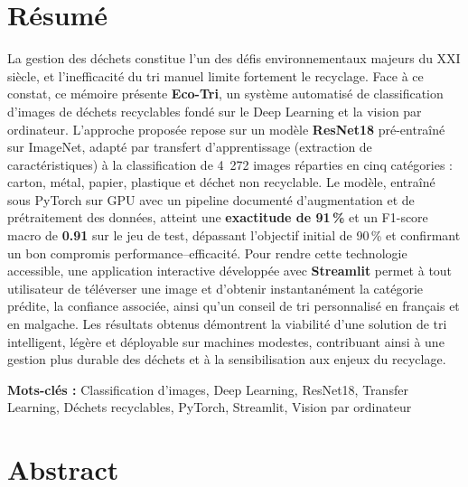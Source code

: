 \documentclass[12pt,a4paper]{report}
\begin{document}
\tableofcontents
\newpage

\listoffigures
{}
\newpage

\listoftables
{}
\newpage

\chapter*{Résumé}

La gestion des déchets constitue l'un des défis environnementaux majeurs du XXI siècle, et l'inefficacité du tri manuel limite fortement le recyclage. Face à ce constat, ce mémoire présente \textbf{Eco-Tri}, un système automatisé de classification d'images de déchets recyclables fondé sur le Deep Learning et la vision par ordinateur. L'approche proposée repose sur un modèle \textbf{ResNet18} pré-entraîné sur ImageNet, adapté par transfert d'apprentissage (extraction de caractéristiques) à la classification de 4~272 images réparties en cinq catégories : carton, métal, papier, plastique et déchet non recyclable. Le modèle, entraîné sous PyTorch sur GPU avec un pipeline documenté d'augmentation et de prétraitement des données, atteint une \textbf{exactitude de 91\,\%} et un F1-score macro de \textbf{0.91} sur le jeu de test, dépassant l'objectif initial de 90\,\% et confirmant un bon compromis performance--efficacité. Pour rendre cette technologie accessible, une application interactive développée avec \textbf{Streamlit} permet à tout utilisateur de téléverser une image et d'obtenir instantanément la catégorie prédite, la confiance associée, ainsi qu'un conseil de tri personnalisé en français et en malgache. Les résultats obtenus démontrent la viabilité d'une solution de tri intelligent, légère et déployable sur machines modestes, contribuant ainsi à une gestion plus durable des déchets et à la sensibilisation aux enjeux du recyclage.

\vspace{0.5cm}
\textbf{Mots-clés :} Classification d'images, Deep Learning, ResNet18, Transfer Learning, Déchets recyclables, PyTorch, Streamlit, Vision par ordinateur

\newpage

\chapter*{Abstract}
\end{document}
